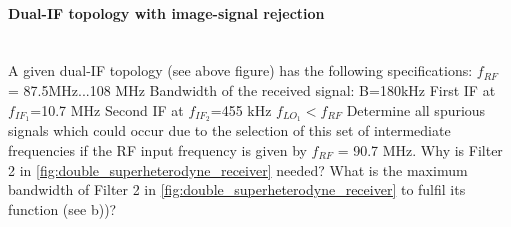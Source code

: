 \paragraph{Dual-IF topology with image-signal rejection}\mbox{}\\
A given dual-IF topology (see above figure) has the following specifications:\newline
$f_{R F}$ = 87.5MHz...108 MHz\newline
Bandwidth of the received signal: B=180kHz\newline
First IF at $f_{IF_1}$=10.7 MHz\newline
Second IF at $f_{IF_2}$=455 kHz\newline
$f_{LO_1}<f_{RF}$\newline
Determine all spurious signals which could occur due to the selection of this set of intermediate
frequencies if the RF input frequency is given by $f_{R F}$ = 90.7 MHz.
Why is Filter 2 in \autoref{fig:double_superheterodyne_receiver} needed?
What is the maximum bandwidth of Filter 2 in \autoref{fig:double_superheterodyne_receiver} to fulfil its function (see b))?


